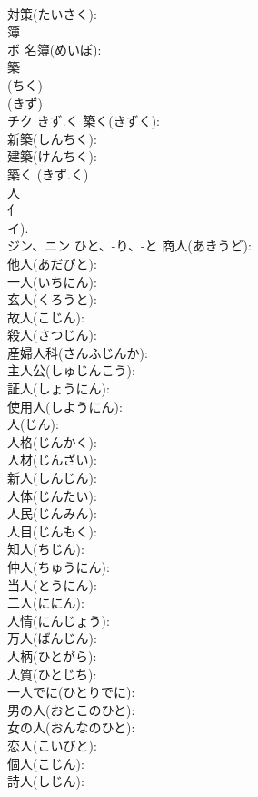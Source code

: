 \documentclass[8pt]{extreport}
\begin{document}
\begin{CJK}{UTF8}{min}
\\	対策(たいさく): 
\\	簿			
\\	ボ		名簿(めいぼ): 
\\	築			
\\	(ちく) 
\\	(きず) 
\\	チク	きず.く	築く(きずく): 
\\	新築(しんちく): 
\\	建築(けんちく): 
\\	築く (きず.く)
\\	人			
\\	⺅ 
\\	イ). 
\\	ジン、ニン	ひと、-り、-と	商人(あきうど): 
\\	他人(あだびと): 
\\	一人(いちにん): 
\\	玄人(くろうと): 
\\	故人(こじん): 
\\	殺人(さつじん): 
\\	産婦人科(さんふじんか): 
\\	主人公(しゅじんこう): 
\\	証人(しょうにん): 
\\	使用人(しようにん): 
\\	人(じん): 
\\	人格(じんかく): 
\\	人材(じんざい): 
\\	新人(しんじん): 
\\	人体(じんたい): 
\\	人民(じんみん): 
\\	人目(じんもく): 
\\	知人(ちじん): 
\\	仲人(ちゅうにん): 
\\	当人(とうにん): 
\\	二人(ににん): 
\\	人情(にんじょう): 
\\	万人(ばんじん): 
\\	人柄(ひとがら): 
\\	人質(ひとじち): 
\\	一人でに(ひとりでに): 
\\	男の人(おとこのひと): 
\\	女の人(おんなのひと): 
\\	恋人(こいびと): 
\\	個人(こじん): 
\\	詩人(しじん): 

\end{CJK}
\end{document}
